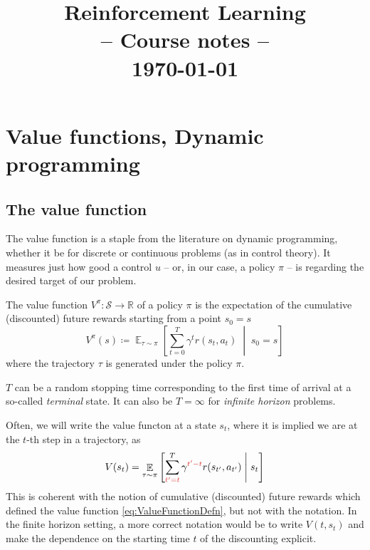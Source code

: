 \documentclass[12pt]{report}
\title{
{
	\sffamily\Huge
	\textbf{Reinforcement Learning}\\
	{\bluefont-- Course notes --}
}\\[2ex]
\normalsize\sffamily\today
}
\date{}
\newcommand\RR{\mathbb{R}}
\newcommand{\scalemid}{\;\middle|\;}
\DeclareMathOperator{\EE}{\mathbb{E}}
\newcommand{\calS}{\mathcal{S}}
\newcommand{\redfont}{\color{darkred}}
\begin{document}
\maketitle


\chapter{Value functions, Dynamic programming}

\section{The value function}

The value function is a staple from the literature on dynamic programming, whether it be for discrete or continuous problems (as in control theory). It measures just how good a control $u$ -- or, in our case, a policy $\pi$ -- is regarding the desired target of our problem.


\begin{defn}
The value function $V^\pi\colon \calS \to \RR$ of a policy $\pi$ is the expectation of the cumulative (discounted) future rewards starting from a point $s_0 = s$
\begin{equation}\label{eq:ValueFunctionDefn}
	V^\pi(s) \coloneqq
	\EE_{\tau\sim\pi}\left[
	\sum_{t=0}^T \gamma^t r(s_t, a_t)
	\scalemid s_0 = s
	\right]
\end{equation}
where the trajectory $\tau$ is generated under the policy $\pi$.

$T$ can be a random stopping time corresponding to the first time of arrival at a so-called \emph{terminal} state. It can also be $T = \infty$ for \emph{infinite horizon} problems.
\end{defn}


\begin{remark}
	Often, we will write the value functon at a state $s_t$, where it is implied we are at the $t$-th step in a trajectory, as
	\[
	V(s_t) = \EE_{\tau\sim\pi}\left[
	\sum_{{\redfont t'=t}}^T \gamma^{{\redfont t'-t}} r(s_{t'}, a_{t'})
	\scalemid s_t
	\right]
	\]
	This is coherent with the notion of cumulative (discounted) future rewards which defined the value function \eqref{eq:ValueFunctionDefn}, but not with the notation. In the finite horizon setting, a more correct notation would be to write $V(t, s_t)$ and make the dependence on the starting time $t$ of the discounting explicit.
\end{remark}
\end{document}
